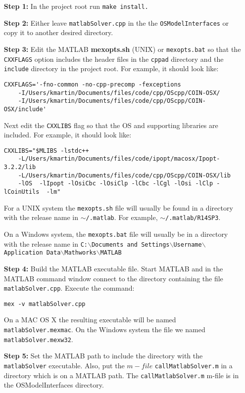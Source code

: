 \documentclass[11pt]{article}
\renewcommand{\_}{{\char"5F}}
\renewcommand{\{}{{\char"7B}}
\renewcommand{\}}{{\char"7D}}
\renewcommand{\^}{{\char"0D}}
\renewcommand{\'}{{\char"0D}}
\begin{document}
\begin{itemize}


\item[{\bf Step  1:}] In the project root run {\tt make install.}

\item[{\bf Step  2:}]   Either leave {\tt matlabSolver.cpp} in the  the {\tt OSModelInterfaces} or copy it to another desired directory.

\item[{\bf Step 3:}] Edit the MATLAB  {\bf mexopts.sh} (UNIX) or {\tt mexopts.bat}  so that the {\tt CXXFLAGS} option includes the header files in the {\tt cppad} directory and the {\tt include} directory in the project root. For example, it  should look like:
\begin{verbatim}
CXXFLAGS='-fno-common -no-cpp-precomp -fexceptions
    -I/Users/kmartin/Documents/files/code/cpp/OScpp/COIN-OSX/
    -I/Users/kmartin/Documents/files/code/cpp/OScpp/COIN-OSX/include'
\end{verbatim}

Next edit the {\tt CXXLIBS} flag so that the OS and supporting libraries are included. For example, it should look like:

\begin{verbatim}
CXXLIBS="$MLIBS -lstdc++
    -L/Users/kmartin/Documents/files/code/ipopt/macosx/Ipopt-3.2.2/lib
    -L/Users/kmartin/Documents/files/code/cpp/OScpp/COIN-OSX/lib
    -lOS  -lIpopt -lOsiCbc -lOsiClp -lCbc -lCgl -lOsi -lClp -lCoinUtils  -lm"
\end{verbatim}

For a UNIX system the {\tt mexopts.sh} file will usually be found in a directory with the release name in {\tt  $\sim$/.matlab}. For example,
{\tt $\sim$/.matlab/R14SP3}.


On a Windows system, the {\tt  mexopts.bat} file will usually be in a directory with the release name in {\tt C:$\backslash$Documents and Settings$\backslash$Username$\backslash$Application Data$\backslash$Mathworks$\backslash$MATLAB}


\item[{\bf Step 4:}]  Build the MATLAB executable file. Start MATLAB and in the MATLAB command window connect to the directory containing the file {\tt matlabSolver.cpp}.  Execute the command:

\begin{verbatim}
mex -v matlabSolver.cpp
\end{verbatim}

On a MAC OS X the resulting executable will be named {\tt matlabSolver.mexmac}. On the Windows system the file we named {\tt matlabSolver.mexw32}.

\item[{\bf Step 5:}]  Set the MATLAB path to include the directory with the {\tt matlabSolver} executable. Also, put  the $m-file$ {\tt callMatlabSolver.m} in a directory which is on a MATLAB path.  The  {\tt callMatlabSolver.m} m-file is in the OSModelInterfaces directory.

\end{itemize}
\end{document}
